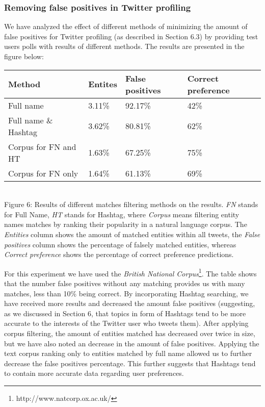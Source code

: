 \subsubsection{Removing false positives in Twitter profiling}

We have analyzed the effect of different methods of minimizing the amount of false
positives for Twitter profiling (as described in Section 6.3) by providing test users
polls with results of different methods. The results are presented in the figure below:

\begin{center}
  \begin{tabular}{ | p{4cm} | p{2cm} | p{2cm} | p{2cm} | } \hline
    Method & Entites & False positives & Correct preference \\ \hline
    Full name & 3.11\% & 92.17\% & 42\% \\ \hline
    Full name \& Hashtag & 3.62\% & 80.81\% & 62\% \\ \hline
    Corpus for FN and HT & 1.63\% & 67.25\% & 75\% \\ \hline
    Corpus for FN only & 1.64\% & 61.13\% & 69\% \\ \hline
  \end{tabular} \\
  Figure 6: Results of different matches filtering methods on the results. \textit{FN} stands for Full Name,
  \textit{HT} stands for Hashtag, where \textit{Corpus} means filtering entity names matches by ranking
  their popularity in a natural language corpus. The \textit{Entities} column shows the amount of matched
  entities within all tweets, the \textit{False positives} column shows the percentage of falsely matched
  entities, whereas \textit{Correct preference} shows the percentage of correct preference predictions.
\end{center}

For this experiment we have used the \textit{British National Corpus}\footnote{http://www.natcorp.ox.ac.uk/}.
The table shows that the number false positives without any matching provides us with many matches, less than
10\% being correct. By incorporating Hashtag searching, we have received more results and decreased the amount
false positives (suggesting, as we discussed in Section 6, that topics in form of Hashtags tend to be more
accurate to the interests of the Twitter user who tweets them). After applying corpus filtering, the amount of
entities matched has decreased over twice in size, but we have also noted an decrease in the amount of false positives.
Applying the text corpus ranking only to entities matched by full name allowed us to further decrease the false
positives percentage. This further suggests that Hashtags tend to contain more accurate data regarding
user preferences.

